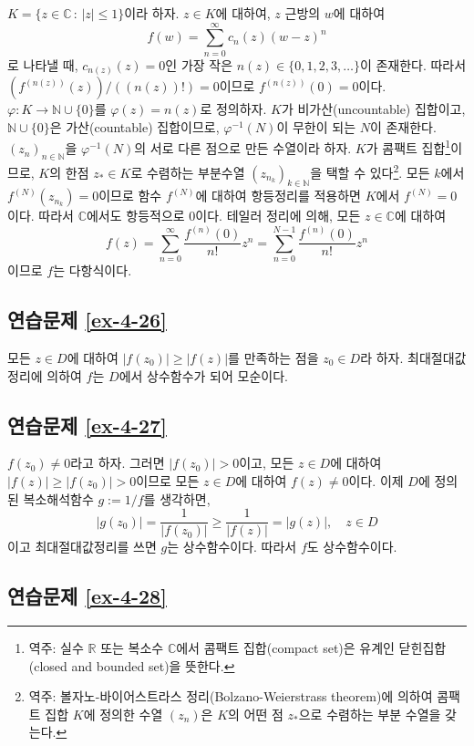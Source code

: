 $K=\{z\in\mathbb C\,:\, |z|\le 1\}$이라 하자.
$z\in K$에 대하여, $z$ 근방의 $w$에 대하여
\[
f(w) = \sum_{n=0}^\infty c_n(z)(w-z)^n
\]
로 나타낼 때, $c_{n(z)}(z)=0$인 가장 작은 $n(z)\in\{0,1,2,3,\ldots\}$이 존재한다.
따라서 $(f^{(n(z))}(z))/((n(z))!)=0$이므로 $f^{(n(z))}(0)=0$이다.
$\varphi:K\to \mathbb N \cup \{0\}$를 $\varphi(z)=n(z)$로 정의하자.
$K$가 비가산(uncountable) 집합이고, $\mathbb N\cup \{0\}$은 가산(countable) 집합이므로,
$\varphi^{-1}(N)$이 무한이 되는 $N$이 존재한다.
$(z_n)_{n\in\mathbb N}$을 $\varphi^{-1}(N)$의 서로 다른 점으로 만든 수열이라 하자.
$K$가 콤팩트 집합\footnote{
역주: 실수 $\mathbb R$ 또는 복소수  $\mathbb C$에서
콤팩트 집합(compact set)은 유계인 닫힌집합(closed and bounded set)을 뜻한다.
}이므로, $K$의 한점 $z_*\in K$로 수렴하는 부분수열 $(z_{n_k})_{k\in\mathbb N}$을
택할 수 있다\footnote{
역주: 볼자노-바이어스트라스 정리(Bolzano-Weierstrass theorem)에 의하여
콤팩트 집합 $K$에 정의한 수열 $(z_n)$은 $K$의 어떤 점 $z_*$으로 수렴하는
부분 수열을 갖는다. 
}. 
모든 $k$에서 $f^{(N)}(z_{n_k})=0$이므로  함수 $f^{(N)}$에 대하여 항등정리를 적용하면
$K$에서 $f^{(N)}=0$이다. 따라서 $\mathbb C$에서도  항등적으로 $0$이다.
테일러 정리에 의해, 모든 $z\in\mathbb C$에 대하여
\[
f(z) = \sum_{n=0}^\infty \dfrac{f^{(n)}(0)}{n!} z^n= \sum_{n=0}^{N-1} \dfrac{f^{(n)}(0)}{n!}z^n
\]
이므로 $f$는 다항식이다.

\subsection*{연습문제 \ref{ex-4-26}}

모든 $z\in D$에 대하여 $|f(z_0)| \ge |f(z)|$를 만족하는 점을 $z_0\in D$라 하자.
최대절대값정리에 의하여 $f$는 $D$에서 상수함수가 되어 모순이다.

\subsection*{연습문제 \ref{ex-4-27}}

$f(z_0)\ne0$라고 하자.
그러면 $|f(z_0)|>0$이고,
모든 $z\in D$에 대하여 $|f(z)|\ge|f(z_0)|>0$이므로
모든 $z\in D$에 대하여 $f(z)\ne0$이다.
이제 $D$에 정의된 복소해석함수 $g:=1/f$를 생각하면,
\[
|g(z_0)|  = \dfrac1{|f(z_0)|} \ge \dfrac1{|f(z)|} = |g(z)|,
\quad z\in D
\]
이고 최대절대값정리를 쓰면 $g$는 상수함수이다. 따라서 $f$도 상수함수이다.

\subsection*{연습문제 \ref{ex-4-28}}

